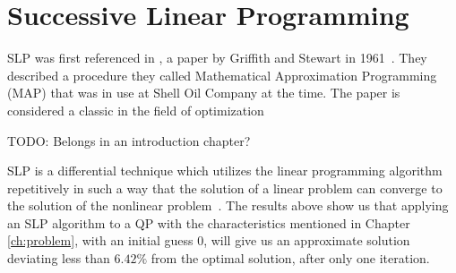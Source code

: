 \section{Successive Linear Programming}
SLP was first referenced in \cite{slp61}, a paper by Griffith and Stewart in
1961~\cite{boggs1985numerical}.
They described a procedure they called Mathematical Approximation Programming
(MAP) that was in use at Shell Oil Company at the time. The paper is considered
a classic in the field of optimization

TODO: Belongs in an introduction chapter?

SLP is a differential technique which utilizes the linear programming algorithm
repetitively in such a way that the solution of a linear problem can converge
to the solution of the nonlinear problem~\cite{slp61}. The results above show
us that applying an SLP algorithm to a QP with the characteristics mentioned in
Chapter \ref{ch:problem}, with an initial guess 0, will give us an approximate
solution deviating less than $6.42\%$ from the optimal solution, after only one
iteration.
